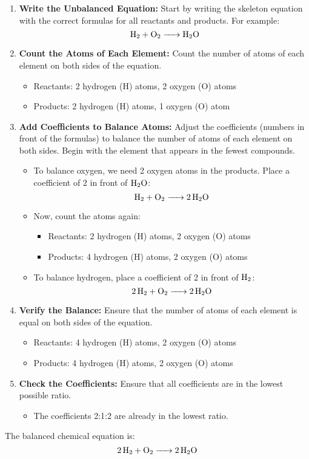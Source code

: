 \documentclass[10pt, roman]{article}
\begin{document}
\begin{enumerate}
    \item \textbf{Write the Unbalanced Equation:} Start by writing the skeleton equation with the correct formulas for all reactants and products. For example:
    \[
    \ce{H2 + O2 -> H2O}
    \]
    \item \textbf{Count the Atoms of Each Element:} Count the number of atoms of each element on both sides of the equation.
    \begin{itemize}
        \item Reactants: 2 hydrogen (H) atoms, 2 oxygen (O) atoms
        \item Products: 2 hydrogen (H) atoms, 1 oxygen (O) atom
    \end{itemize}
    \item \textbf{Add Coefficients to Balance Atoms:} Adjust the coefficients (numbers in front of the formulas) to balance the number of atoms of each element on both sides. Begin with the element that appears in the fewest compounds.
    \begin{itemize}
        \item To balance oxygen, we need 2 oxygen atoms in the products. Place a coefficient of 2 in front of \(\ce{H2O}\):
        \[
        \ce{H2 + O2 -> 2H2O}
        \]
        \item Now, count the atoms again:
        \begin{itemize}
            \item Reactants: 2 hydrogen (H) atoms, 2 oxygen (O) atoms
            \item Products: 4 hydrogen (H) atoms, 2 oxygen (O) atoms
        \end{itemize}
        \item To balance hydrogen, place a coefficient of 2 in front of \(\ce{H2}\):
        \[
        \ce{2H2 + O2 -> 2H2O}
        \]
    \end{itemize}
    \item \textbf{Verify the Balance:} Ensure that the number of atoms of each element is equal on both sides of the equation.
    \begin{itemize}
        \item Reactants: 4 hydrogen (H) atoms, 2 oxygen (O) atoms
        \item Products: 4 hydrogen (H) atoms, 2 oxygen (O) atoms
    \end{itemize}
    \item \textbf{Check the Coefficients:} Ensure that all coefficients are in the lowest possible ratio.
    \begin{itemize}
        \item The coefficients 2:1:2 are already in the lowest ratio.
    \end{itemize}
\end{enumerate}
The balanced chemical equation is:
\[
\ce{2H2 + O2 -> 2H2O}
\]
\end{document}
